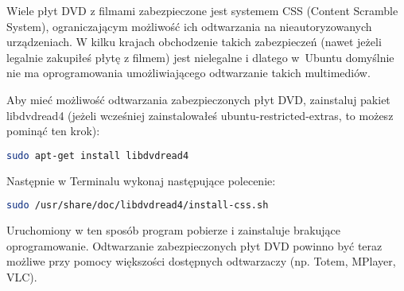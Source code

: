 Wiele płyt DVD z filmami zabezpieczone jest systemem CSS (Content Scramble System), ograniczającym możliwość ich odtwarzania na nieautoryzowanych urządzeniach. W kilku krajach obchodzenie takich zabezpieczeń (nawet jeżeli legalnie zakupiłeś płytę z filmem) jest nielegalne i dlatego w~Ubuntu domyślnie nie ma oprogramowania umożliwiającego odtwarzanie takich multimediów.

Aby mieć możliwość odtwarzania zabezpieczonych płyt DVD, zainstaluj pakiet \textcolor{ubuntu_orange}{libdvdread4} (jeżeli wcześniej zainstalowałeś ubuntu-restricted-extras, to możesz pominąć ten krok):

\begin{lstlisting}[language=bash]
sudo apt-get install libdvdread4
\end{lstlisting}

\noindent Następnie w Terminalu wykonaj następujące polecenie:

\begin{lstlisting}[language=bash]
sudo /usr/share/doc/libdvdread4/install-css.sh
\end{lstlisting}

\noindent Uruchomiony w ten sposób program pobierze i zainstaluje brakujące oprogramowanie. Odtwarzanie zabezpieczonych płyt DVD powinno być teraz możliwe przy pomocy większości dostępnych odtwarzaczy (np. Totem, MPlayer, VLC).
